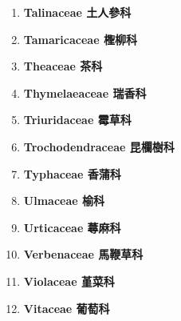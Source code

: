 \begin{enumerate}
        
      \item[] \begin{small}\textbf{Talinaceae 土人參科} \end{small}
        
      \item[] \begin{small}\textbf{Tamaricaceae 檉柳科} \end{small}
        
      \item[] \begin{small}\textbf{Theaceae 茶科} \end{small}
        
      \item[] \begin{small}\textbf{Thymelaeaceae 瑞香科} \end{small}
        
      \item[] \begin{small}\textbf{Triuridaceae 霉草科} \end{small}
        
      \item[] \begin{small}\textbf{Trochodendraceae 昆欄樹科} \end{small}
        
      \item[] \begin{small}\textbf{Typhaceae 香蒲科} \end{small}
        
      \item[] \begin{small}\textbf{Ulmaceae 榆科} \end{small}
        
      \item[] \begin{small}\textbf{Urticaceae 蕁麻科} \end{small}
        
      \item[] \begin{small}\textbf{Verbenaceae 馬鞭草科} \end{small}
        
      \item[] \begin{small}\textbf{Violaceae 堇菜科} \end{small}
        
      \item[] \begin{small}\textbf{Vitaceae 葡萄科} \end{small}

\end{enumerate}
